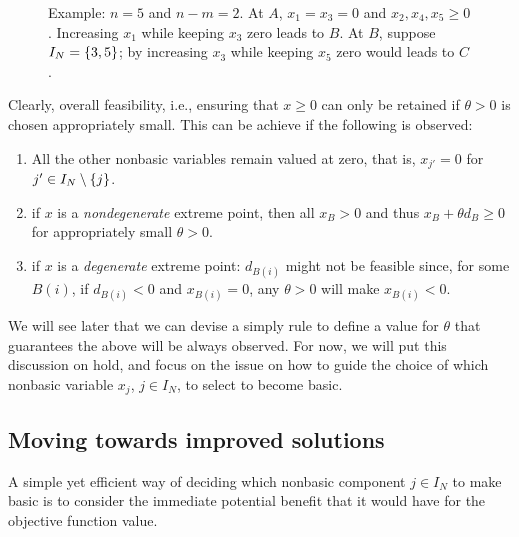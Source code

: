 \begin{figure}[h]
	\caption{Example: $n = 5$ and $n-m = 2$. At $A$, $x_1 = x_3 = 0$ and $x_2, x_4, x_5 \geq 0$. Increasing $x_1$ while keeping $x_3$ zero leads to $B$. At $B$, suppose $I_N = \left\{ 3,5 \right \}$; by increasing $x_3$ while keeping $x_5$ zero would leads to $C$.} \label{p1c3:fig:adjacent_vertices}
\end{figure}

Clearly, overall feasibility, i.e., ensuring that $x \ge 0$ can only be retained if $\theta > 0$ is chosen appropriately small. This can be achieve if the following is observed:
%
\begin{enumerate}
	\item All the other nonbasic variables remain valued at zero, that is, $x_{j'} = 0$ for $j' \in I_N \setminus \left\{ j \right \}$.	
	\item if $x$ is a \emph{nondegenerate} extreme point, then all $x_B > 0$ and thus $x_B + \theta d_B \geq 0$ for appropriately small $\theta > 0$. 
	\item if $x$ is a \emph{degenerate} extreme point: $d_{B(i)}$ might not be feasible since, for some $B(i)$, if $d_{B(i)} < 0$ and $x_{B(i)} = 0$, any $\theta > 0$ will make $x_{B(i)} < 0$.
\end{enumerate}
%
We will see later that we can devise a simply rule to define a value for $\theta$ that guarantees the above will be always observed. For now, we will put this discussion on hold, and focus on the issue on how to guide the choice of which nonbasic variable $x_j$, $j \in I_N$, to select to become basic.


\subsection{Moving towards improved solutions}

A simple yet efficient way of deciding which nonbasic component $j \in I_N$ to make basic is to consider the immediate potential benefit that it would have for the objective function value. 

